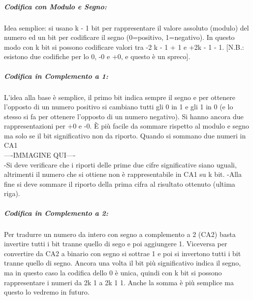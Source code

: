 \subparagraph*{Codifica con Modulo e Segno:} Idea semplice: si usano k - 1 bit per rappresentare il valore assoluto (modulo) del numero  ed un bit per codificare il segno (0=positivo, 1=negativo). In questo modo con k bit si possono codificare valori tra -2 k - 1 + 1 e +2k - 1 - 1. [N.B.: esistono due codifiche per lo 0, -0  e +0, e questo è un spreco].

\subparagraph*{Codifica in Complemento a 1:} L’idea alla base è semplice, il primo bit indica sempre il segno e per ottenere l’opposto di un numero positivo si cambiano tutti gli 0 in 1 e gli 1 in 0 (e lo stesso si fa per ottenere l’opposto di un numero negativo). Si hanno ancora due rappresentazioni per +0 e -0. È più facile da sommare rispetto al modulo e segno ma solo se il bit significativo non da riporto.
Quando si sommano due numeri in CA1
\\ ----IMMAGINE QUI----\\
-Si deve verificare che i riporti delle prime due cifre significative siano uguali, altrimenti il numero che si ottiene non è rappresentabile in CA1 su k bit.
-Alla fine si deve sommare il riporto della prima cifra al risultato ottenuto (ultima riga).

\subparagraph*{Codifica in Complemento a 2:} Per tradurre un numero da intero con segno a complemento a 2 (CA2) basta invertire tutti i bit tranne quello di sego e poi aggiungere 1. Viceversa per convertire da CA2 a binario con segno si sottrae 1 e poi si invertono tutti i bit tranne quello di segno. 
Ancora una volta il bit più significativo indica il segno, ma in questo caso la codifica dello 0 è unica, quindi con k bit si possono rappresentare i numeri da 2k  1 a 2k  1  1. Anche la somma è più semplice ma questo lo vedremo in futuro.

